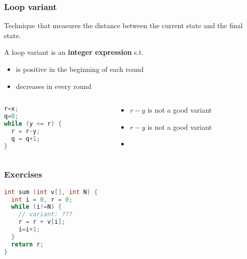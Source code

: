 \documentclass[aspectratio=169]{beamer}
\begin{document}
\begin{frame}[fragile]\frametitle{Loop variant}
  
  Technique that measures the distance between the current state and the final state.

  \begin{block}{A loop variant is an \textbf{integer expression} s.t.}
    \begin{itemize}
      \item is positive in the beginning of each round
      \item decreases in every round
    \end{itemize}
  \end{block}

\begin{columns}
\begin{column}{0.48\textwidth}
\begin{lstlisting}[language=C++]
r=x;
q=0;
while (y <= r) {
  r = r-y;
  q = q+1;
}
\end{lstlisting}
\end{column}
\begin{column}{0.48\textwidth}
  \begin{itemize}
    \item $r-y$ is not a good variant
    \item $r-y$ is not a good variant
    \item {}
  \end{itemize}
\end{column}
\end{columns}

\end{frame}

\begin{frame}[fragile]\frametitle{Exercises}

\begin{lstlisting}[language=C++]
int sum (int v[], int N) {
  int i = 0, r = 0;
  while (i!=N) {
    // variant: ???
    r = r + v[i];
    i=i+1;
  }
  return r;
}
\end{lstlisting}



\end{frame}
\end{document}

